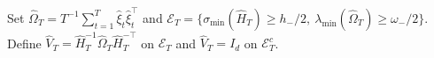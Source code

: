 Set \(\widehat\Omega_T=T^{-1}\sum_{t=1}^T\widehat\xi_t\widehat\xi_t^\top\) and \(\mathcal E_T=\{\sigma_{\min}(\widehat H_T)\ge h_-/2,\ \lambda_{\min}(\widehat\Omega_T)\ge\omega_-/2\}\). Define \(\widehat V_T=\widehat H_T^{-1}\widehat\Omega_T\widehat H_T^{-\top}\) on \(\mathcal E_T\) and \(\widehat V_T=I_d\) on \(\mathcal E_T^c\).